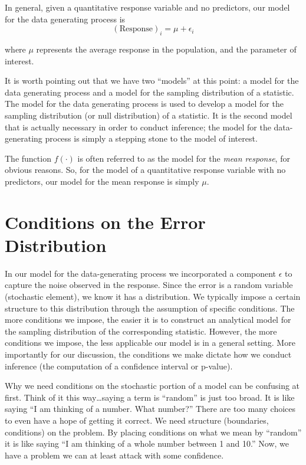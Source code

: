 \documentclass[
]{book}
\theoremstyle{plain}
\theoremstyle{mydefn}
\theoremstyle{myexmpl}
\theoremstyle{remark}
\begin{document}
\begin{rmdtip}
In general, given a quantitative response variable and no predictors, our model for the data generating process is
\[(\text{Response})_i = \mu + \epsilon_i\]

where \(\mu\) represents the average response in the population, and the parameter of interest.
\end{rmdtip}

It is worth pointing out that we have two ``models'' at this point: a model for the data generating process and a model for the sampling distribution of a statistic. The model for the data generating process is used to develop a model for the sampling distribution (or null distribution) of a statistic. It is the second model that is actually necessary in order to conduct inference; the model for the data-generating process is simply a stepping stone to the model of interest.

\begin{rmdtip}
The function \(f(\cdot)\) is often referred to as the model for the \emph{mean response}, for obvious reasons. So, for the model of a quantitative response variable with no predictors, our model for the mean response is simply \(\mu\).
\end{rmdtip}

\hypertarget{conditions-on-the-error-distribution}{%
\section{Conditions on the Error Distribution}\label{conditions-on-the-error-distribution}}

In our model for the data-generating process we incorporated a component \(\epsilon\) to capture the noise observed in the response. Since the error is a random variable (stochastic element), we know it has a distribution. We typically impose a certain structure to this distribution through the assumption of specific conditions. The more conditions we impose, the easier it is to construct an analytical model for the sampling distribution of the corresponding statistic. However, the more conditions we impose, the less applicable our model is in a general setting. More importantly for our discussion, the conditions we make dictate how we conduct inference (the computation of a confidence interval or p-value).

\begin{rmdtip}
Why we need conditions on the stochastic portion of a model can be confusing at first. Think of it this way\ldots saying a term is ``random'' is just too broad. It is like saying ``I am thinking of a number. What number?'' There are too many choices to even have a hope of getting it correct. We need structure (boundaries, conditions) on the problem. By placing conditions on what we mean by ``random'' it is like saying ``I am thinking of a whole number between 1 and 10.'' Now, we have a problem we can at least attack with some confidence.
\end{rmdtip}
\end{document}
